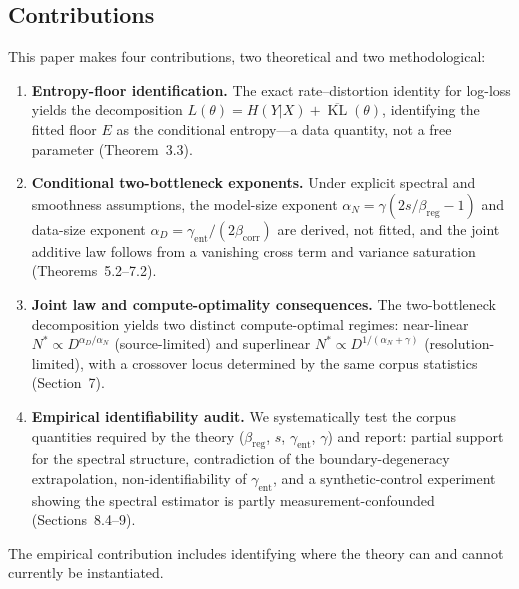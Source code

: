 \documentclass[12pt]{article}
\newcommand{\KL}{\operatorname{KL}}
\theoremstyle{remark}
\begin{document}
\subsection*{Contributions}
This paper makes four contributions, two theoretical and two methodological:
\begin{enumerate}[label=\textbf{(\roman*)}]
\item \textbf{Entropy-floor identification.}
  The exact rate--distortion identity for log-loss yields the decomposition
  $L(\theta)=H(Y|X)+\overline{\KL}(\theta)$, identifying the fitted floor $E$
  as the conditional entropy---a data quantity, not a free parameter
  (Theorem~3.3).
\item \textbf{Conditional two-bottleneck exponents.}
  Under explicit spectral and smoothness assumptions, the model-size exponent
  $\alpha_N=\gamma(2s/\beta_{\mathrm{reg}}-1)$ and data-size exponent
  $\alpha_D=\gamma_{\mathrm{ent}}/(2\beta_{\mathrm{corr}})$ are derived, not fitted, and
  the joint additive law follows from a vanishing cross term and variance
  saturation (Theorems~5.2--7.2).
\item \textbf{Joint law and compute-optimality consequences.}
  The two-bottleneck decomposition yields two distinct compute-optimal regimes:
  near-linear $N^*\!\propto\!D^{\alpha_D/\alpha_N}$ (source-limited) and
  superlinear $N^*\!\propto\!D^{1/(\alpha_N+\gamma)}$ (resolution-limited), with
  a crossover locus determined by the same corpus statistics
  (Section~7).
\item \textbf{Empirical identifiability audit.}
  We systematically test the corpus quantities required by the theory
  ($\beta_{\mathrm{reg}}$, $s$, $\gamma_{\mathrm{ent}}$, $\gamma$) and report: partial
  support for the spectral structure, contradiction of the boundary-degeneracy
  extrapolation, non-identifiability of $\gamma_{\mathrm{ent}}$, and a
  synthetic-control experiment showing the spectral estimator is partly
  measurement-confounded
  (Sections~8.4--9).
\end{enumerate}
The empirical contribution includes identifying where the theory can and
cannot currently be instantiated.
\end{document}
